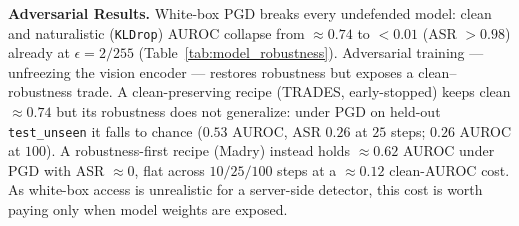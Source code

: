 \documentclass{article}
\begin{document}
\vspace{-5pt}
\textbf{Adversarial Results.} White-box PGD breaks every undefended model: clean
and naturalistic (\texttt{KLDrop}) AUROC collapse from $\approx\!0.74$ to
$<\!0.01$ (ASR $>0.98$) already at $\epsilon{=}2/255$
(Table~\ref{tab:model_robustness}). Adversarial training --- unfreezing the
vision encoder --- restores robustness but
exposes a clean--robustness trade. A clean-preserving recipe (TRADES,
early-stopped) keeps clean $\approx\!0.74$ but its robustness does not
generalize: under PGD on held-out \texttt{test\_unseen} it falls to chance
($0.53$ AUROC, ASR $0.26$ at $25$ steps; $0.26$ AUROC at $100$). A
robustness-first recipe (Madry) instead holds $\approx\!0.62$ AUROC under PGD
with ASR $\approx\!0$, flat across $10/25/100$ steps
at a $\approx\!0.12$ clean-AUROC cost. As white-box access is unrealistic for a
server-side detector, this cost is worth paying only when model weights are
exposed.


\begin{table}[!tb]
\vskip -0.05in
\centering
\begin{small}
\setlength{\tabcolsep}{3pt}


\vskip -0.08in
\caption{\footnotesize Cross-robustness on \texttt{test\_unseen} ($3$-seed mean
AUROC): clean, and attacked AUROC (drop $\Delta$ vs.\ clean) under
worst naturalistic cell and white-box PGD ($L_\infty$, $\epsilon{=}8/255$,
$25$ steps).}
\label{tab:model_robustness}
\end{small}
\vskip -0.2in
\end{table}
\end{document}
